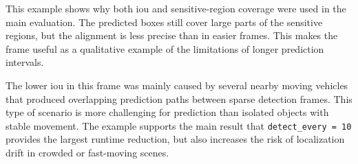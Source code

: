 This example shows why both \acrshort{iou} and sensitive-region coverage were used in the main evaluation. The predicted boxes still cover large parts of the sensitive regions, but the alignment is less precise than in easier frames. This makes the frame useful as a qualitative example of the limitations of longer prediction intervals.

The lower \acrshort{iou} in this frame was mainly caused by several nearby moving vehicles that produced overlapping prediction paths between sparse detection frames. This type of scenario is more challenging for prediction than isolated objects with stable movement. The example supports the main result that \texttt{detect\_every = 10} provides the largest runtime reduction, but also increases the risk of localization drift in crowded or fast-moving scenes.